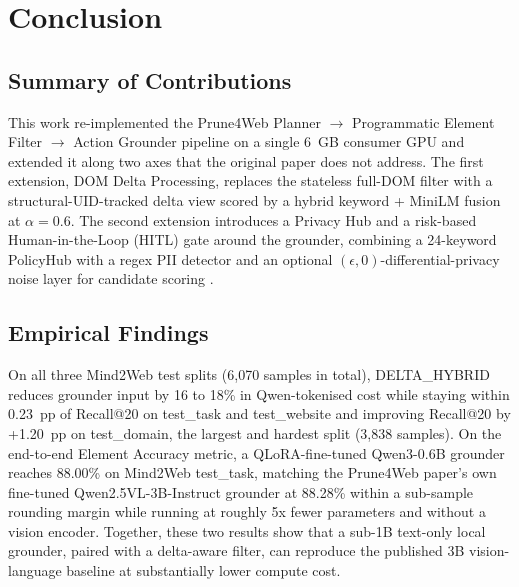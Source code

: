 \chapter{Conclusion}

\section{Summary of Contributions}
This work re-implemented the Prune4Web Planner $\to$ Programmatic Element Filter $\to$ Action Grounder pipeline \cite{zhang2025prune4web} on a single 6~GB consumer GPU and extended it along two axes that the original paper does not address. The first extension, DOM Delta Processing, replaces the stateless full-DOM filter with a structural-UID-tracked delta view scored by a hybrid keyword + MiniLM \cite{wang2020minilm} fusion at $\alpha = 0.6$. The second extension introduces a Privacy Hub and a risk-based Human-in-the-Loop (HITL) gate around the grounder, combining a 24-keyword PolicyHub with a regex PII detector and an optional $(\epsilon, 0)$-differential-privacy noise layer for candidate scoring \cite{dettmers2023qlora}.

\section{Empirical Findings}
On all three Mind2Web \cite{deng2023mind2webgeneralistagentweb} test splits (6{,}070 samples in total), DELTA\_HYBRID reduces grounder input by 16 to 18\% in Qwen-tokenised cost while staying within 0.23~pp of Recall@20 on test\_task and test\_website and improving Recall@20 by +1.20~pp on test\_domain, the largest and hardest split (3{,}838 samples). On the end-to-end Element Accuracy metric, a QLoRA-fine-tuned Qwen3-0.6B grounder reaches 88.00\% on Mind2Web test\_task, matching the Prune4Web paper's own fine-tuned Qwen2.5VL-3B-Instruct grounder at 88.28\% within a sub-sample rounding margin while running at roughly 5x fewer parameters and without a vision encoder. Together, these two results show that a sub-1B text-only local grounder, paired with a delta-aware filter, can reproduce the published 3B vision-language baseline at substantially lower compute cost.


